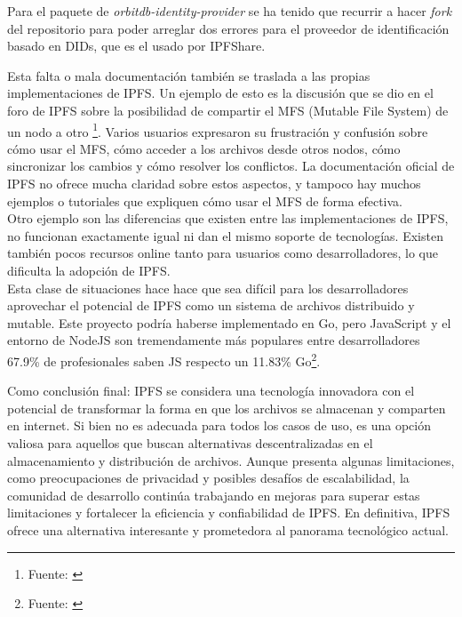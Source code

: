 Para el paquete de \textit{orbitdb-identity-provider} se ha tenido que recurrir a hacer \textit{fork} del repositorio para poder arreglar
dos errores para el proveedor de identificación basado en DIDs, que es el usado por IPFShare.

Esta falta o mala documentación también se traslada a las propias implementaciones de IPFS. Un ejemplo de esto es la discusión que se dio en el foro de IPFS sobre la posibilidad de compartir el MFS (Mutable File System) de un nodo a otro \footnote{Fuente: \cite{ItPossibleShare}}. Varios usuarios expresaron su frustración y confusión sobre cómo usar el MFS, cómo acceder a los archivos desde otros nodos, cómo sincronizar los cambios y cómo resolver los conflictos. La documentación oficial de IPFS no ofrece mucha claridad sobre estos aspectos, y tampoco hay muchos ejemplos o tutoriales que expliquen cómo usar el MFS de forma efectiva.
\\Otro ejemplo son las diferencias que existen entre las implementaciones de IPFS, no funcionan exactamente igual ni dan el mismo soporte de tecnologías. Existen también pocos recursos online tanto para usuarios como desarrolladores, lo que dificulta la adopción de IPFS.
\\Esta clase de situaciones hace hace que sea difícil para los desarrolladores aprovechar el potencial de IPFS como un sistema de archivos distribuido y mutable. Este proyecto podría haberse implementado en Go, pero JavaScript y el entorno de NodeJS son tremendamente más populares entre desarrolladores 67.9\% de profesionales saben JS respecto un 11.83\% Go\footnote{Fuente: \cite{StackOverflowDeveloper}}.

Como conclusión final: IPFS se considera una tecnología innovadora con el potencial de transformar la forma en que los archivos se almacenan y comparten en internet. Si bien no es adecuada para todos los casos de uso, es una opción valiosa para aquellos que buscan alternativas descentralizadas en el almacenamiento y distribución de archivos. Aunque presenta algunas limitaciones, como preocupaciones de privacidad y posibles desafíos de escalabilidad, la comunidad de desarrollo continúa trabajando en mejoras para superar estas limitaciones y fortalecer la eficiencia y confiabilidad de IPFS. En definitiva, IPFS ofrece una alternativa interesante y prometedora al panorama tecnológico actual.